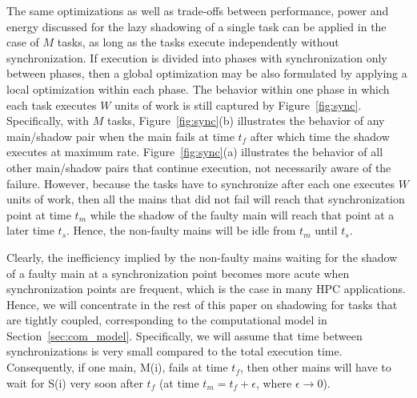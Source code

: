 The same optimizations as well as trade-offs between performance, power and energy discussed for the lazy shadowing of a single task can be applied in the case of $M$ tasks,
as long as the tasks execute independently without synchronization. If execution is divided into phases with synchronization only between phases, then a global optimization may be also formulated by applying a local optimization within each phase.
The behavior within one phase in which each task executes $W$ units of work is still captured by Figure~\ref{fig:sync}. Specifically, with $M$ tasks,
Figure~\ref{fig:sync}(b) illustrates the behavior of any main/shadow pair when the main fails at time $t_f$ after which time the shadow
executes at maximum rate. Figure~\ref{fig:sync}(a) illustrates the behavior of all other main/shadow pairs that continue execution, not necessarily aware of the failure. However, because the tasks have to synchronize after each one executes $W$ units of work, then all the mains that did not fail will reach that synchronization point at time $t_m$ while the shadow of the faulty main will reach that point at a later time $t_s$.  Hence, the non-faulty mains will be idle from $t_m$ until $t_s$.

Clearly, the inefficiency implied by the non-faulty mains waiting for the shadow of a faulty main at a synchronization point becomes more acute when synchronization points are frequent, which is the case in many HPC applications. Hence, we will concentrate in the rest of this paper on shadowing for tasks that are tightly coupled, corresponding to the computational model in Section~\ref{sec:com_model}. Specifically, we will assume that time between synchronizations is very small compared to the total execution time. Consequently, if one main, M(i), fails at time $t_f$, then other mains will have to wait for S(i) very soon after $t_f$ (at time $t_m = t_f+\epsilon$, where $\epsilon \to 0$).

